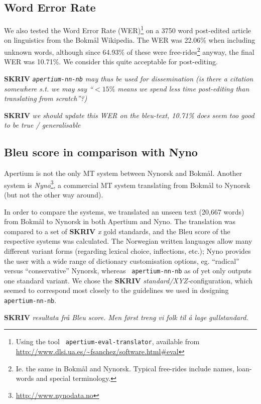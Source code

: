 \documentclass[11pt]{article}
\newcommand{\comment}[1]{\textbf{SKRIV} {\it #1}}
\begin{document}
\subsection{Word Error Rate}
\label{sec:WER}
We also tested the Word Error Rate (WER)\footnote{Using the tool {\tt
    apertium-eval-translator}, available from
  \href{http://www.dlsi.ua.es/~fsanchez/software.html\#eval}{http://www.dlsi.ua.es/\~{}fsanchez/software.html\#eval}}
on a 3750 word post-edited article on linguistics from the Bokmål
Wikipedia. The WER was 22.06\% when including unknown words, although
since 64.93\% of these were free-rides\footnote{Ie. the same
  in Bokmål and Nynorsk. Typical free-rides include names, loan-words
  and special terminology.} anyway, the final WER was 10.71\%. We
consider this quite acceptable for post-editing.

\comment{ {\tt apertium-nn-nb} may thus be used for dissemination (is
there a citation somewhere s.t. we may say ``$<15\%$ means we spend less
time post-editing than translating from scratch''?)}

\comment{ we should update this WER on the bleu-text, 10.71\%
does seem too good to be true / generalisable}

\subsection{Bleu score in comparison with Nyno}

Apertium is not the only MT system between Nynorsk and Bokmål. Another
system is
\textit{Nyno}\footnote{\href{http://www.nynodata.no}{http://www.nynodata.no}},
a commercial MT system translating from Bokmål to Nynorsk (but not the
other way around). 

In order to compare the systems, we translated an unseen text (20,667
words) from Bokmål to Nynorsk in both Apertium and Nyno. The
translation was compared to a set of \comment{x} gold standards, and
the {\sc Bleu} score \citep{papineni2001bleu} of the respective
systems was calculated. The Norwegian written languages allow many
different variant forms (regarding lexical choice, inflections, etc.);
Nyno provides the user with a wide range of dictionary customisation
options, eg. ``radical'' versus ``conservative'' Nynorsk, whereas {\tt
  apertium-nn-nb} as of yet only outputs one standard variant. We
chose the \comment{standard/XYZ-}configuration, which seemed to
correspond most closely to the guidelines we used in designing {\tt
  apertium-nn-nb}.

\comment{resultata frå Bleu score. Men først treng vi folk til å lage gullstandard.}
\end{document}
